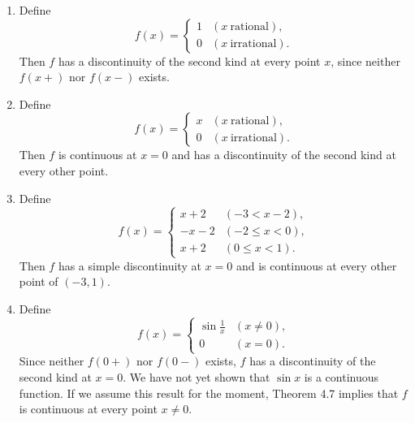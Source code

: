 \documentclass[../poma-notes.tex]{subfiles}
\begin{document}
\begin{examples}
  \begin{enumerate}[label=(\alph*)]
    \item Define
          \[
            f(x) =
            \begin{cases}
              1 & (x \ \text{rational}),   \\
              0 & (x \ \text{irrational}).
            \end{cases}
          \]
          Then $f$ has a discontinuity of the second kind at every point $x$, since neither $f(x+)$ nor $f(x-)$ exists.
    \item Define
          \[
            f(x) =
            \begin{cases}
              x & (x \ \text{rational}),   \\
              0 & (x \ \text{irrational}).
            \end{cases}
          \]
          Then $f$ is continuous at $x = 0$ and has a discontinuity of the second kind at every other point.
    \item Define
          \[
            f(x) =
            \begin{cases}
              x + 2  & (-3 < x -2),    \\
              -x - 2 & (-2 \le x < 0), \\
              x + 2  & (0 \le x < 1).
            \end{cases}
          \]
          Then $f$ has a simple discontinuity at $x = 0$ and is continuous at every other point of $(-3, 1)$.
    \item Define
          \[
            f(x) =
            \begin{cases}
              \sin\frac{1}{x} & (x \ne 0), \\
              0               & (x = 0).
            \end{cases}
          \]
          Since neither $f(0+)$ nor $f(0-)$ exists, $f$ has a discontinuity of the second kind at $x = 0$. We have not yet shown
          that $\sin x$ is a continuous function. If we assume this result for the moment, Theorem 4.7 implies that $f$ is
          continuous at every point $x \ne 0$.
  \end{enumerate}
\end{examples}
\end{document}
